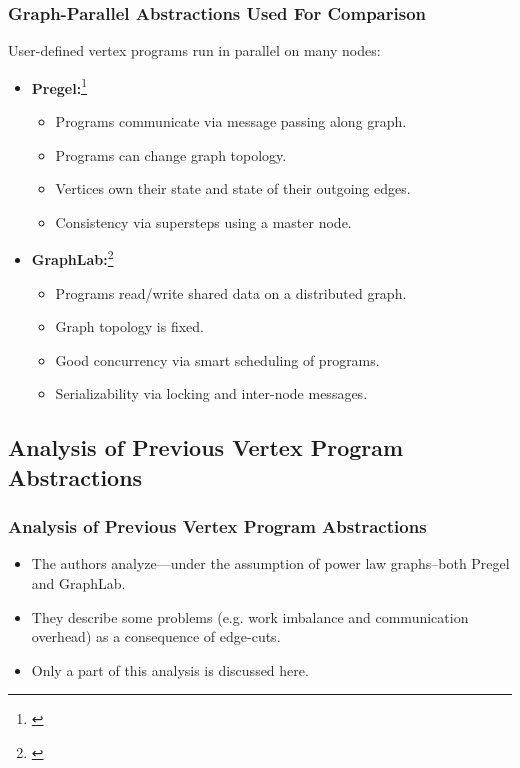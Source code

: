 \begin{frame}
  \frametitle{Graph-Parallel Abstractions Used For Comparison}
  User-defined vertex programs run in parallel on many nodes:
  \begin{itemize}
    \item \textbf{Pregel:}\footnote{\cite[SIGMOD '10]{malewicz2010pregel}}
      \begin{itemize}
        \item Programs communicate via message passing along graph.
        \item Programs can change graph topology.
        \item Vertices own their state and state of their outgoing edges.
        \item Consistency via supersteps using a master node.
      \end{itemize}
    \item \textbf{GraphLab:}\footnote{\cite[VLDB '12]{low2012distributed}}
      \begin{itemize}
        \item Programs read/write shared data on a distributed graph.
        \item Graph topology is fixed.
        \item Good concurrency via smart scheduling of programs.
        \item Serializability via locking and inter-node messages.
      \end{itemize}
  \end{itemize}
\end{frame}


\subsection{Analysis of Previous Vertex Program Abstractions}

\begin{frame}
  \frametitle{Analysis of Previous Vertex Program Abstractions}
  \begin{itemize}
  \item The authors analyze---under the assumption of power law graphs--both
        Pregel and GraphLab.
  \item They describe some problems (e.g. work imbalance and communication
        overhead) as a consequence of edge-cuts.
  \item Only a part of this analysis is discussed here.
  \end{itemize}
\end{frame}

